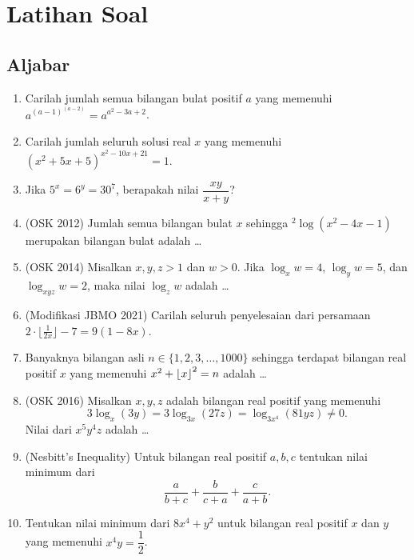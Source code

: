     \section{Latihan Soal}
    \subsection{Aljabar}
    \begin{enumerate}
        \item Carilah jumlah semua bilangan bulat positif $a$ yang memenuhi $a^{(a-1)^{(a-2)}}=a^{a^2-3a+2}$.
        
        \item Carilah jumlah seluruh solusi real $x$ yang memenuhi $(x^2+5x+5)^{x^2-10x+21}=1.$
        
        \item Jika $5^x=6^y=30^7$, berapakah nilai $\dfrac{xy}{x+y}$?
        
        \item (OSK 2012) Jumlah semua bilangan bulat $x$ sehingga $^2 \log (x^2-4x-1)$ merupakan bilangan bulat adalah \dots
        
        \item (OSK 2014) Misalkan $x,y,z>1$ dan $w>0$. Jika $\log_x w = 4$, $\log_y w = 5$, dan $\log_{xyz} w = 2$, maka nilai $\log_z w$ adalah \dots 
        
        \item (Modifikasi JBMO 2021) Carilah seluruh penyelesaian dari persamaan $2\cdot \lfloor{\frac{1}{2x}}\rfloor - 7 = 9(1 - 8x)$.
        
        \item Banyaknya bilangan asli $n \in \{1,2,3,\dots,1000\}$ sehingga terdapat bilangan real positif $x$ yang memenuhi $x^2+\left\lfloor x \right\rfloor^2=n$ adalah \dots
        
        \item (OSK 2016) Misalkan $x,y,z$ adalah bilangan real positif yang memenuhi $$3 \log_x (3y) = 3 \log_{3x} (27z) = \log_{3x^4} (81yz) \neq 0.$$ Nilai dari $x^5y^4z$ adalah \dots
        
        \item (Nesbitt's Inequality) Untuk bilangan real positif $a,b,c$ tentukan nilai minimum dari $$\dfrac{a}{b+c}+\dfrac{b}{c+a}+\dfrac{c}{a+b}.$$
        
        \item Tentukan nilai minimum dari $8x^4+y^2$ untuk bilangan real positif $x$ dan $y$ yang memenuhi $x^4y=\dfrac{1}{2}$.
        

\end{enumerate}
